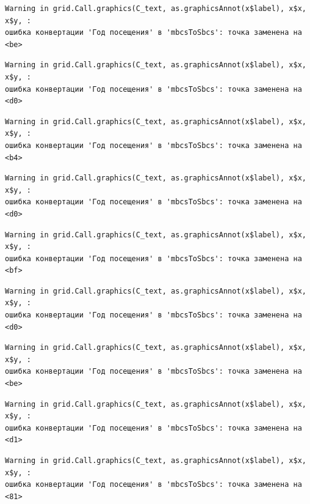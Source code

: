 \documentclass[
  letterpaper,
  DIV=11,
  numbers=noendperiod]{scrreprt}
\begin{document}
\begin{verbatim}
Warning in grid.Call.graphics(C_text, as.graphicsAnnot(x$label), x$x, x$y, :
ошибка конвертации 'Год посещения' в 'mbcsToSbcs': точка заменена на <be>
\end{verbatim}

\begin{verbatim}
Warning in grid.Call.graphics(C_text, as.graphicsAnnot(x$label), x$x, x$y, :
ошибка конвертации 'Год посещения' в 'mbcsToSbcs': точка заменена на <d0>
\end{verbatim}

\begin{verbatim}
Warning in grid.Call.graphics(C_text, as.graphicsAnnot(x$label), x$x, x$y, :
ошибка конвертации 'Год посещения' в 'mbcsToSbcs': точка заменена на <b4>
\end{verbatim}

\begin{verbatim}
Warning in grid.Call.graphics(C_text, as.graphicsAnnot(x$label), x$x, x$y, :
ошибка конвертации 'Год посещения' в 'mbcsToSbcs': точка заменена на <d0>
\end{verbatim}

\begin{verbatim}
Warning in grid.Call.graphics(C_text, as.graphicsAnnot(x$label), x$x, x$y, :
ошибка конвертации 'Год посещения' в 'mbcsToSbcs': точка заменена на <bf>
\end{verbatim}

\begin{verbatim}
Warning in grid.Call.graphics(C_text, as.graphicsAnnot(x$label), x$x, x$y, :
ошибка конвертации 'Год посещения' в 'mbcsToSbcs': точка заменена на <d0>
\end{verbatim}

\begin{verbatim}
Warning in grid.Call.graphics(C_text, as.graphicsAnnot(x$label), x$x, x$y, :
ошибка конвертации 'Год посещения' в 'mbcsToSbcs': точка заменена на <be>
\end{verbatim}

\begin{verbatim}
Warning in grid.Call.graphics(C_text, as.graphicsAnnot(x$label), x$x, x$y, :
ошибка конвертации 'Год посещения' в 'mbcsToSbcs': точка заменена на <d1>
\end{verbatim}

\begin{verbatim}
Warning in grid.Call.graphics(C_text, as.graphicsAnnot(x$label), x$x, x$y, :
ошибка конвертации 'Год посещения' в 'mbcsToSbcs': точка заменена на <81>
\end{verbatim}
\end{document}
